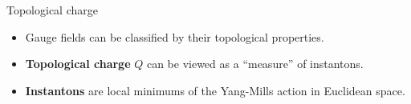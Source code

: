 \documentclass[10pt,show notes on second screen]{beamer}
\begin{document}
\begin{frame}{Topological charge}
\begin{block}{}
\begin{itemize}
    \item <1->{Gauge fields can be classified by their topological properties.}
    \item <2->{\textbf{Topological charge} $Q$ can be viewed as a ``measure'' of instantons.}
    \item <3->{\textbf{Instantons} are local minimums of the Yang-Mills action in Euclidean space.}
\end{itemize}
\end{block}
\end{frame}
\end{document}
